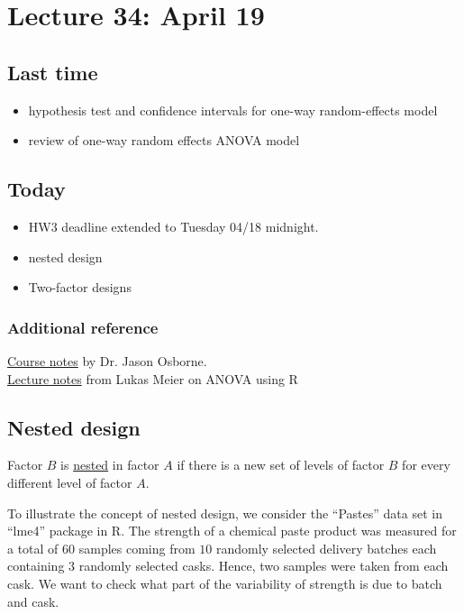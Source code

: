 \setcounter{section}{33}

\section{Lecture 34: April 19}


\subsection*{Last time}
\begin{itemize}
\item hypothesis test and confidence intervals for one-way random-effects model
\item review of one-way random effects ANOVA model
\end{itemize}


\subsection*{Today}
\begin{itemize}
\item HW3 deadline extended to Tuesday 04/18 midnight.
\item nested design
\item Two-factor designs
\end{itemize}

\subsubsection*{Additional reference}
\href{https://www4.stat.ncsu.edu/~osborne/st512r/handouts/allpackets.pdf}{Course notes} by Dr. Jason Osborne.\\
\href{https://stat.ethz.ch/~meier/teaching/anova/random-and-mixed-effects-models.html#random-effects-models}{Lecture notes} from Lukas Meier on ANOVA using R

\subsection*{Nested design}
Factor $B$ is \underline{nested} in factor $A$ if there is a new set of levels of factor $B$ for every different level of factor $A$.

To illustrate the concept of nested design, we consider the ``Pastes'' data set in ``lme4'' package in R.
The strength of a chemical paste product was measured for a total of $60$ samples coming from $10$ randomly selected delivery batches each containing $3$ randomly selected casks.
Hence, two samples were taken from each cask.
We want to check what part of the variability of strength is due to batch and cask.

